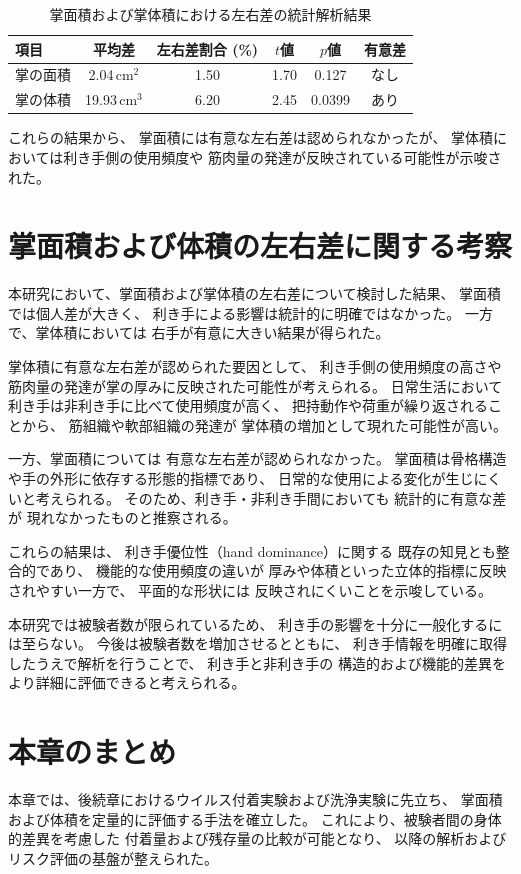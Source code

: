\begin{table}[htbp]
  \centering
  \caption{掌面積および掌体積における左右差の統計解析結果}
  \label{tab:hand_lr_ttest}
  \begin{tabular}{l c c c c c}
    \hline
    項目 & 平均差 & 左右差割合 (\%) & $t$値 & $p$値 & 有意差 \\
    \hline
    掌の面積 & 2.04\,cm$^2$ & 1.50 & 1.70 & 0.127 & なし \\
    掌の体積 & 19.93\,cm$^3$ & 6.20 & 2.45 & 0.0399 & あり \\
    \hline
  \end{tabular}
\end{table}

これらの結果から、
掌面積には有意な左右差は認められなかったが、
掌体積においては利き手側の使用頻度や
筋肉量の発達が反映されている可能性が示唆された。


\section{掌面積および体積の左右差に関する考察}

本研究において、掌面積および掌体積の左右差について検討した結果、
掌面積では個人差が大きく、
利き手による影響は統計的に明確ではなかった。
一方で、掌体積においては
右手が有意に大きい結果が得られた。

掌体積に有意な左右差が認められた要因として、
利き手側の使用頻度の高さや
筋肉量の発達が掌の厚みに反映された可能性が考えられる。
日常生活において利き手は非利き手に比べて使用頻度が高く、
把持動作や荷重が繰り返されることから、
筋組織や軟部組織の発達が
掌体積の増加として現れた可能性が高い。

一方、掌面積については
有意な左右差が認められなかった。
掌面積は骨格構造や手の外形に依存する形態的指標であり、
日常的な使用による変化が生じにくいと考えられる。
そのため、利き手・非利き手間においても
統計的に有意な差が
現れなかったものと推察される。

これらの結果は、
利き手優位性（hand dominance）に関する
既存の知見とも整合的であり、
機能的な使用頻度の違いが
厚みや体積といった立体的指標に反映されやすい一方で、
平面的な形状には
反映されにくいことを示唆している。

本研究では被験者数が限られているため、
利き手の影響を十分に一般化するには至らない。
今後は被験者数を増加させるとともに、
利き手情報を明確に取得したうえで解析を行うことで、
利き手と非利き手の
構造的および機能的差異を
より詳細に評価できると考えられる。


\section{本章のまとめ}

本章では、後続章におけるウイルス付着実験および洗浄実験に先立ち、
掌面積および体積を定量的に評価する手法を確立した。
これにより、被験者間の身体的差異を考慮した
付着量および残存量の比較が可能となり、
以降の解析およびリスク評価の基盤が整えられた。
